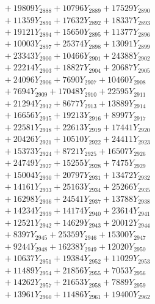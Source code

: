 \documentclass[a4paper,10pt]{article}
\begin{document}
{\begin{align}
&\;  + 19809 Y_{2888} + 10796 Y_{2889} + 17529 Y_{2890} \\[0.3ex]
&\;  + 11359 Y_{2891} + 17632 Y_{2892} + 18337 Y_{2893} \\[0.3ex]
&\;  + 19121 Y_{2894} + 15650 Y_{2895} + 11377 Y_{2896} \\[0.3ex]
&\;  + 10003 Y_{2897} + 25374 Y_{2898} + 13091 Y_{2899} \\[0.3ex]
&\;  + 23343 Y_{2900} + 10466 Y_{2901} + 24388 Y_{2902} \\[0.3ex]
&\;  + 22214 Y_{2903} + 18827 Y_{2904} + 20687 Y_{2905} \\[0.3ex]
&\;  + 24096 Y_{2906} + 7690 Y_{2907} + 10460 Y_{2908} \\[0.5ex]\allowbreak
&\;  + 7694 Y_{2909} + 17048 Y_{2910} + 22595 Y_{2911} \\[0.3ex]
&\;  + 21294 Y_{2912} + 8677 Y_{2913} + 13889 Y_{2914} \\[0.3ex]
&\;  + 16656 Y_{2915} + 19213 Y_{2916} + 8997 Y_{2917} \\[0.3ex]
&\;  + 22581 Y_{2918} + 22613 Y_{2919} + 17441 Y_{2920} \\[0.3ex]
&\;  + 20426 Y_{2921} + 10510 Y_{2922} + 24411 Y_{2923} \\[0.3ex]
&\;  + 15373 Y_{2924} + 8721 Y_{2925} + 16507 Y_{2926} \\[0.3ex]
&\;  + 24749 Y_{2927} + 15255 Y_{2928} + 7475 Y_{2929} \\[0.3ex]
&\;  + 15004 Y_{2930} + 20797 Y_{2931} + 13472 Y_{2932} \\[0.3ex]
&\;  + 14161 Y_{2933} + 25163 Y_{2934} + 25266 Y_{2935} \\[0.3ex]
&\;  + 16298 Y_{2936} + 24541 Y_{2937} + 13788 Y_{2938} \\[0.5ex]\allowbreak
&\;  + 14234 Y_{2939} + 14174 Y_{2940} + 23614 Y_{2941} \\[0.3ex]
&\;  + 12521 Y_{2942} + 14629 Y_{2943} + 20012 Y_{2944} \\[0.3ex]
&\;  + 8397 Y_{2945} + 25359 Y_{2946} + 15300 Y_{2947} \\[0.3ex]
&\;  + 9244 Y_{2948} + 16238 Y_{2949} + 12020 Y_{2950} \\[0.3ex]
&\;  + 10637 Y_{2951} + 19384 Y_{2952} + 11029 Y_{2953} \\[0.3ex]
&\;  + 11489 Y_{2954} + 21856 Y_{2955} + 7053 Y_{2956} \\[0.3ex]
&\;  + 14262 Y_{2957} + 21653 Y_{2958} + 7889 Y_{2959} \\[0.3ex]
&\;  + 13961 Y_{2960} + 11486 Y_{2961} + 19400 Y_{2962} \\[0.3ex]

\end{align}}
\end{document}

